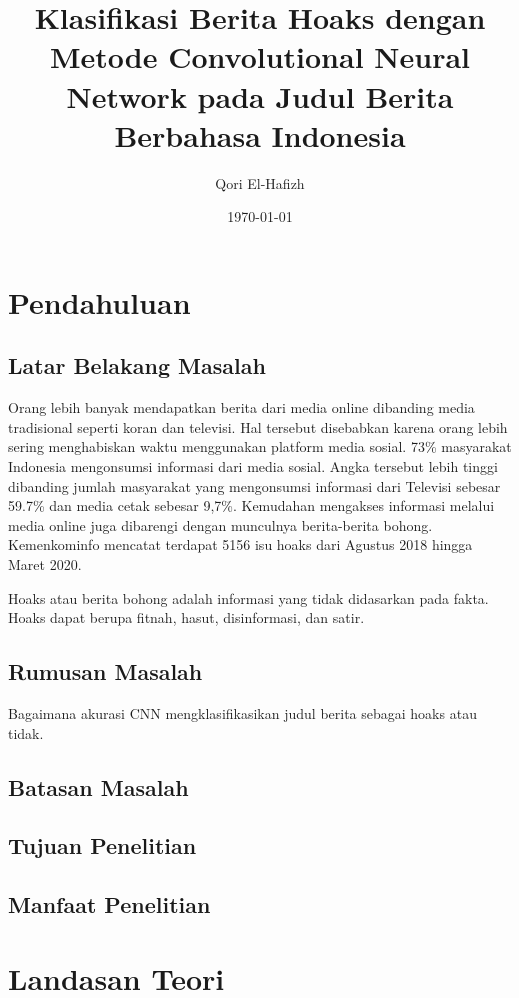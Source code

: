 \documentclass[a4paper,12pt]{report}
\title{Klasifikasi Berita Hoaks dengan Metode Convolutional Neural Network pada Judul Berita Berbahasa Indonesia}
\author{Qori El-Hafizh}
\date{\today}
\begin{document}
\maketitle

\begin{abstract}
\end{abstract}

\tableofcontents

\chapter{Pendahuluan}
\section{Latar Belakang Masalah}
Orang lebih banyak mendapatkan berita dari media online dibanding media tradisional seperti koran dan televisi.
Hal tersebut disebabkan karena orang lebih sering menghabiskan waktu menggunakan platform media sosial.
73\% masyarakat Indonesia mengonsumsi informasi dari media sosial.
Angka tersebut lebih tinggi dibanding jumlah masyarakat yang mengonsumsi informasi dari Televisi sebesar 59.7\%
dan media cetak sebesar 9,7\%. \cite*{katadata_73_nodate}
Kemudahan mengakses informasi melalui media online juga dibarengi dengan munculnya berita-berita bohong.
Kemenkominfo mencatat terdapat 5156 isu hoaks dari Agustus 2018 hingga Maret 2020. \cite*{kominfo_detail_nodate}

Hoaks atau berita bohong adalah informasi yang tidak didasarkan pada fakta.
Hoaks dapat berupa fitnah, hasut, disinformasi, dan satir.
\section{Rumusan Masalah}

Bagaimana akurasi CNN mengklasifikasikan judul berita sebagai hoaks atau tidak.

\section{Batasan Masalah}
\section{Tujuan Penelitian}
\section{Manfaat Penelitian}

\chapter{Landasan Teori}
\end{document}
